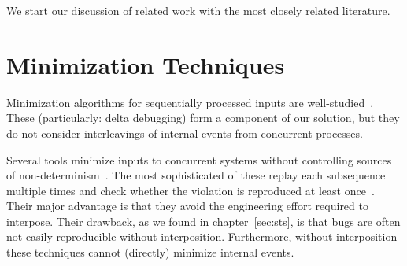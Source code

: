 %



We start our discussion of related work with the most closely
related literature.

\section{Minimization Techniques}

 Minimization
algorithms for sequentially processed inputs are
well-studied~\cite{Zeller:2002:SIF:506201.506206,claessen2000quickcheck,regehr2012test,whitaker2004configuration,burger2011minimizing,fse_web_ddmin,chang2007simulation}.
These (particularly: delta debugging) form a component of our solution, but they do not consider
interleavings of internal events from concurrent processes.

 Several
tools minimize inputs to concurrent
systems without controlling sources of non-determinism~\cite{arts2006testing,clause2007technique,tucek2007triage,jin2013f3,hughes2011testing}.
The most sophisticated of these replay each subsequence
multiple times and check whether the violation is reproduced at least once~\cite{hughes2011testing,claessen2009finding}.
Their major advantage is that they avoid the engineering effort required to
interpose. Their drawback, as we found in chapter~\ref{sec:sts},
 is that bugs are often not easily reproducible without
interposition. Furthermore, without interposition these techniques cannot
(directly) minimize internal events.

